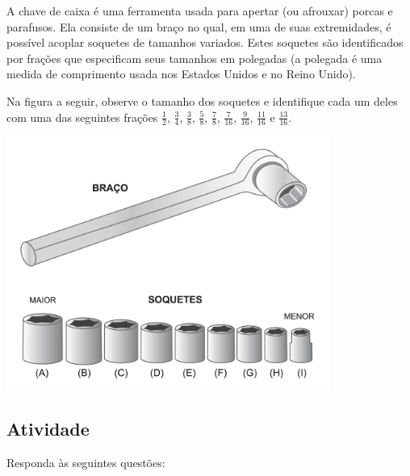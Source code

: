 A chave de caixa é uma ferramenta usada para apertar (ou afrouxar) porcas e parafusos. Ela consiste 
de um braço no qual, em uma de suas extremidades, é possível acoplar soquetes de tamanhos variados.
Estes soquetes são identificados por frações que especificam seus tamanhos em polegadas (a polegada é uma medida de comprimento usada nos Estados Unidos e no Reino Unido).

Na figura a seguir, observe o tamanho dos soquetes e identifique cada um deles com uma das seguintes frações $\frac{1}{2}$, $\frac{3}{4}$, $\frac{3}{8}$, $\frac{5}{8}$, $\frac{7}{8}$, $\frac{7}{16}$, $\frac{9}{16}$, $\frac{11}{16}$ e $\frac{13}{16}$.

\begin{center}
    \includegraphics[width=300pt, keepaspectratio]{../media/cap4/secoes/pngs/ativ14_fig01.png}  
\end{center}

\subsection{Atividade}

Responda às seguintes questões: 

